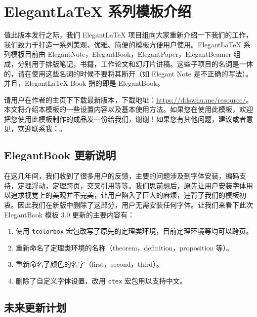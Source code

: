 \documentclass[titlestyle=hang,11pt]{elegantbook}
\author{ddswhu \& LiamHuang0205}
\begin{document}
\maketitle
\tableofcontents
\mainmatter
\chapter{Elegant\LaTeX{} 系列模板介绍}

值此版本发行之际，我们 Elegant\LaTeX{} 项目组向大家重新介绍一下我们的工作，我们致力于打造一系列美观、优雅、简便的模板方便用户使用。Elegant\LaTeX{} 系列模板目前由 ElegantNote，ElegantBook，ElegantPaper，ElegantBeamer 组成，分别用于排版笔记，书籍，工作论文和幻灯片讲稿。这些子项目的名词是一体的，请在使用这些名词的时候不要将其断开（如 Elegant Note 是不正确的写法）。并且，Elegant\LaTeX{}  Book 指的即是 ElegantBook。

请用户在作者的主页下下载最新版本，下载地址：\href{https://ddswhu.me/resource/}{https://ddswhu.me/resource/}。本文将介绍本模板的一些设置内容以及基本使用方法。如果您在使用此模板，欢迎把您使用此模板制作的成品发一份给我们，谢谢！如果您有其他问题，建议或者意见，欢迎联系我：。


\section{ElegantBook 更新说明}
在这几年间，我们收到了很多用户的反馈，主要的问题涉及到字体安装，编码支持，定理浮动，定理跨页，交叉引用等等。我们思前想后，原先让用户安装字体用以追求视觉上的美观并不完美，让用户陷入了巨大的麻烦，违背了我们的模板初衷。因此我们在新版中删除了这部分，用户无需安装任何字体。让我们来看下此次 ElegantBook 模板 3.0 更新的主要内容有：

\begin{enumerate}[noitemsep]
   \item 使用 \texttt{tcolorbox} 宏包改写了原先的定理类环境，目前定理环境等均可以跨页。
   \item 重新命名了定理类环境的名称（theorem，definition，proposition 等）。
   \item 重新命名了颜色的名字（first，second，third）。
   \item 删除了自定义字体设置，改用 \texttt{ctex} 宏包用以支持中文。
\end{enumerate}

\section{未来更新计划}
\end{document}
